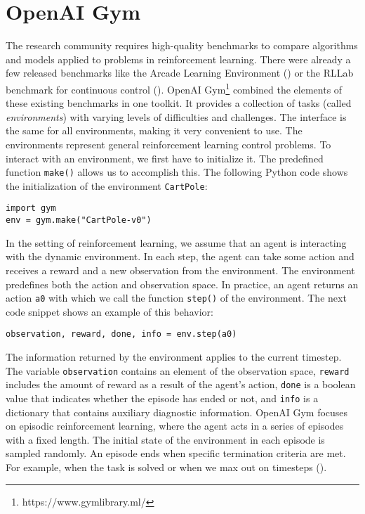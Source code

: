 

\section{OpenAI Gym}
\label{sec:gym}
The research community requires high-quality benchmarks to compare algorithms and models applied to problems in reinforcement learning. There were already a few released benchmarks like the Arcade Learning Environment (\cite{bellemare2013arcade}) or the RLLab benchmark for continuous control (\cite{duan2016benchmarking}). OpenAI Gym\footnote{https://www.gymlibrary.ml/} combined the elements of these existing benchmarks in one toolkit. It provides a collection of tasks (called \textit{environments}) with varying levels of difficulties and challenges. The interface is the same for all environments, making it very convenient to use. The environments represent general reinforcement learning control problems. To interact with an environment, we first have to initialize it. The predefined function \verb|make()| allows us to accomplish this. The following Python code shows the initialization of the environment \verb|CartPole|:
\begin{verbatim}
import gym
env = gym.make("CartPole-v0")
\end{verbatim}
In the setting of reinforcement learning, we assume that an agent is interacting with the dynamic environment. In each step, the agent can take some action and receives a reward and a new observation from the environment. The environment predefines both the action and observation space. In practice, an agent returns an action \verb|a0| with which we call the function \verb|step()| of the environment. The next code snippet shows an example of this behavior:
\begin{verbatim}
observation, reward, done, info = env.step(a0)
\end{verbatim}
The information returned by the environment applies to the current timestep. The variable \verb|observation| contains an element of the observation space, \verb|reward| includes the amount of reward as a result of the agent's action, \verb|done| is a boolean value that indicates whether the episode has ended or not, and \verb|info| is a dictionary that contains auxiliary diagnostic information. OpenAI Gym focuses on episodic reinforcement learning, where the agent acts in a series of episodes with a fixed length. The initial state of the environment in each episode is sampled randomly. An episode ends when specific termination criteria are met. For example, when the task is solved or when we max out on timesteps (\cite{1606.01540}).

